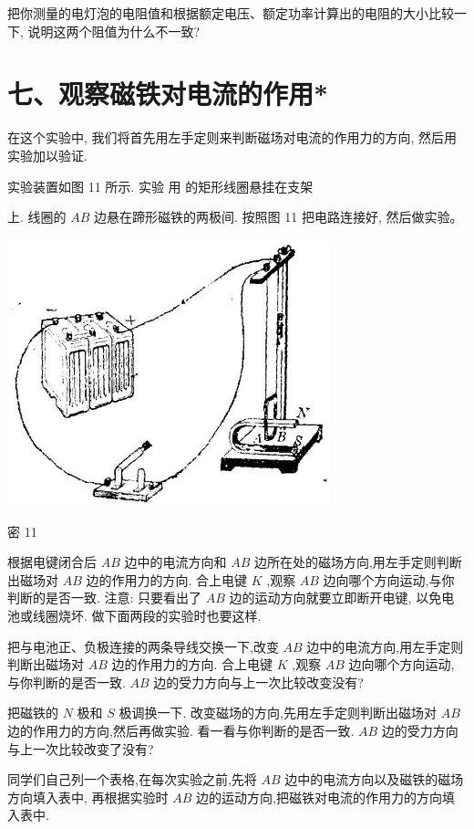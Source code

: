 \documentclass[10pt]{article}
\begin{document}
把你测量的电灯泡的电阻值和根据额定电压、额定功率计算出的电阻的大小比较一下, 说明这两个阻值为什么不一致?

\section*{七、观察磁铁对电流的作用*}

在这个实验中, 我们将首先用左手定则来判断磁场对电流的作用力的方向, 然后用实验加以验证.

实验装置如图 11 所示. 实验 用 的矩形线圈悬挂在支架

上. 线圈的 \({AB}\) 边悬在蹄形磁铁的两极间. 按照图 11 把电路连接好, 然后做实验。

\begin{center}
\includegraphics[max width=0.7\textwidth]{images/01913056-1f15-74d8-9184-9aab52c9d66b_383_712527.jpg}
\end{center}

密 11

根据电键闭合后 \({AB}\) 边中的电流方向和 \({AB}\) 边所在处的磁场方向,用左手定则判断出磁场对 \({AB}\) 边的作用力的方向. 合上电键 \(K\) ,观察 \({AB}\) 边向哪个方向运动,与你判断的是否一致. 注意: 只要看出了 \({AB}\) 边的运动方向就要立即断开电键, 以免电池或线圈烧坏. 做下面两段的实验时也要这样.

把与电池正、负极连接的两条导线交换一下,改变 \({AB}\) 边中的电流方向,用左手定则判断出磁场对 \({AB}\) 边的作用力的方向. 合上电键 \(K\) ,观察 \({AB}\) 边向哪个方向运动,与你判断的是否一致. \({AB}\) 边的受力方向与上一次比较改变没有?

把磁铁的 \(N\) 极和 \(S\) 极调换一下. 改变磁场的方向,先用左手定则判断出磁场对 \({AB}\) 边的作用力的方向,然后再做实验. 看一看与你判断的是否一致. \({AB}\) 边的受力方向与上一次比较改变了没有?

同学们自己列一个表格,在每次实验之前,先将 \({AB}\) 边中的电流方向以及磁铁的磁场方向填入表中, 再根据实验时 \({AB}\) 边的运动方向,把磁铁对电流的作用力的方向填入表中.
\end{document}
